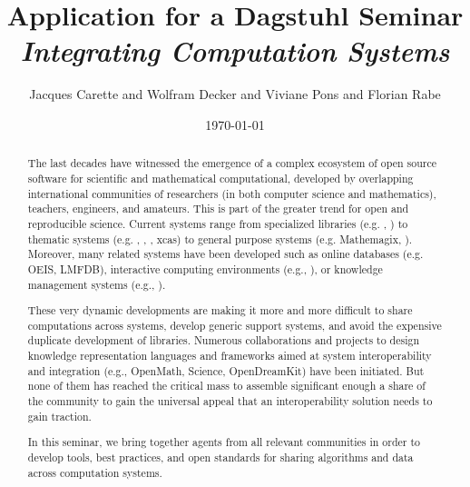 \documentclass[a4paper,11pt]{article}
\title{Application for a Dagstuhl Seminar \\ \emph{Integrating Computation Systems}}
\author{Jacques Carette and Wolfram Decker and Viviane Pons and Florian Rabe}
\date{\today}
\begin{document}
\maketitle

\begin{abstract}
The last decades have witnessed the emergence of a complex ecosystem of open source software for scientific and mathematical computational, developed by overlapping international communities of researchers (in both computer science and mathematics), teachers, engineers, and amateurs.
This is part of the greater trend for open and reproducible science.
Current systems range from specialized libraries (e.g. \MPIR, \Linbox) to thematic systems (e.g. \GAP, \Pari, \Singular, xcas) to general purpose systems (e.g. Mathemagix, \Sage).
Moreover, many related systems have been developed such as online databases (e.g. OEIS, LMFDB), interactive computing environments (e.g., \Jupyter), or knowledge management systems (e.g., \MathHub).

These very dynamic developments are making it more and more difficult to share computations across systems, develop generic support systems, and avoid the expensive duplicate development of libraries.
Numerous collaborations and projects to design knowledge representation languages and frameworks aimed at system interoperability and integration (e.g., OpenMath, Science, OpenDreamKit) have been initiated.
But none of them has reached the critical mass to assemble significant enough a share of the community to gain the universal appeal that an interoperability solution needs to gain traction.

In this seminar, we bring together agents from all relevant communities in order to develop tools, best practices, and open standards for sharing algorithms and data across computation systems.
\end{abstract}


\tableofcontents

\newpage
\end{document}

